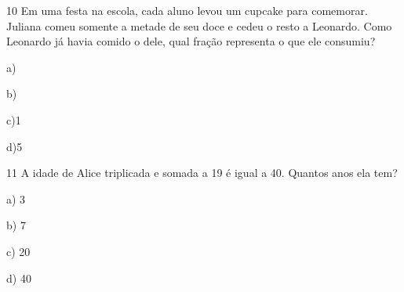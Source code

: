 
\num{10} Em uma festa na escola, cada aluno levou um cupcake para comemorar.
Juliana comeu somente a metade de seu doce e cedeu o resto a Leonardo.
Como Leonardo já havia comido o dele, qual fração representa o que ele
consumiu?

a)

b)

c)1

d)5



\num{11} A idade de Alice triplicada e somada a 19 é igual a 40. Quantos anos
ela tem?

a) 3

b) 7

c) 20

d) 40


